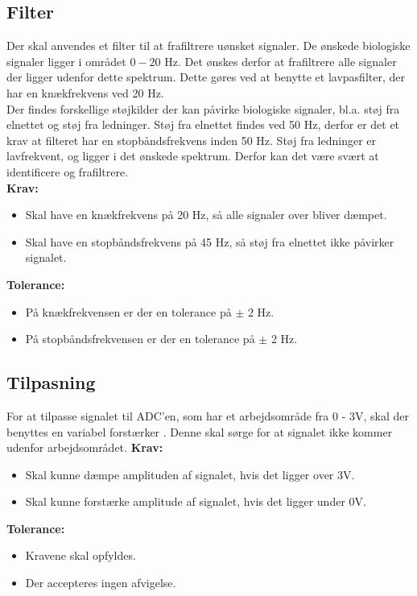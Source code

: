 \subsection{Filter}
Der skal anvendes et filter til at frafiltrere uønsket signaler. De ønskede biologiske signaler ligger i området $0 - 20$ Hz. Det ønskes derfor at frafiltrere alle signaler der ligger udenfor dette spektrum. Dette gøres ved at benytte et lavpasfilter, der har en knækfrekvens ved 20 Hz. \\
Der findes forskellige støjkilder der kan påvirke biologiske signaler, bl.a. støj fra elnettet og støj fra ledninger. Støj fra elnettet findes ved 50 Hz, derfor er det et krav at filteret har en stopbåndsfrekvens inden 50 Hz. Støj fra ledninger er lavfrekvent, og ligger i det ønskede spektrum. Derfor kan det være svært at identificere og frafiltrere. \\
\textbf{Krav:}
\begin{itemize}
\item Skal have en knækfrekvens på 20 Hz, så alle signaler over bliver dæmpet.
\item Skal have en stopbåndsfrekvens på 45 Hz, så støj fra elnettet ikke påvirker signalet.
\end{itemize}
\textbf{Tolerance:}
\begin{itemize}
\item På knækfrekvensen er der en tolerance på $\pm$ 2 Hz.
\item På stopbåndsfrekvensen er der en tolerance på $\pm$ 2 Hz.
\end{itemize}
\subsection{Tilpasning} 
For at tilpasse signalet til ADC'en, som har et arbejdsområde fra 0 - 3V, skal der benyttes en variabel forstærker . Denne skal sørge for at signalet ikke kommer udenfor arbejdsområdet.
\textbf{Krav:}
\begin{itemize}
\item Skal kunne dæmpe amplituden af signalet, hvis det ligger over 3V.
\item Skal kunne forstærke amplitude af signalet, hvis det ligger under 0V.
\end{itemize}
\textbf{Tolerance:}
\begin{itemize}
\item Kravene skal opfyldes.
\item Der accepteres ingen afvigelse.
\end{itemize}
